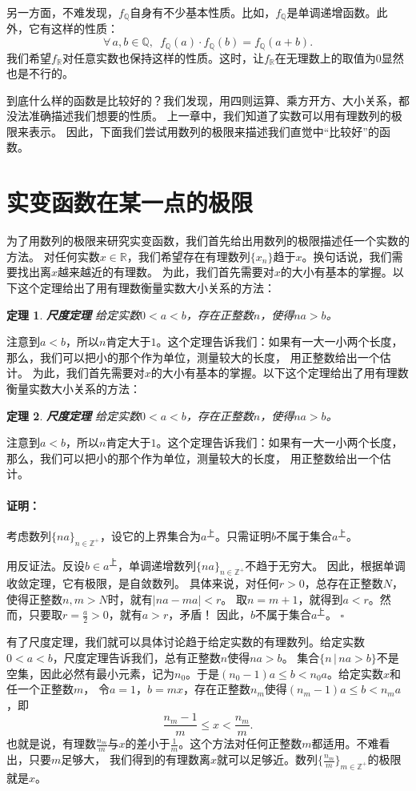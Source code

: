 \documentclass[12pt,UTF8]{ctexbook}
\newtheorem{tm}{定理}[section]
\newenvironment{proof2}{\paragraph{\textbf{证明：}}}{\hfill$\square$}
\begin{document}
另一方面，不难发现，$f_{\mathbb{Q}}$自身有不少基本性质。比如，$f_{\mathbb{Q}}$是单调递增函数。此外，它有这样的性质：
$$\forall \, a, b\in \mathbb{Q}, \,\,\, f_{\mathbb{Q}}(a) \cdot f_{\mathbb{Q}}(b) = f_{\mathbb{Q}}(a + b).$$
我们希望$f_{\mathbb{R}}$对任意实数也保持这样的性质。这时，让$f_{\mathbb{R}}$在无理数上的取值为$0$显然也是不行的。

到底什么样的函数是比较好的？我们发现，用四则运算、乘方开方、大小关系，都没法准确描述我们想要的性质。
上一章中，我们知道了实数可以用有理数列的极限来表示。
因此，下面我们尝试用数列的极限来描述我们直觉中“比较好”的函数。

\section{实变函数在某一点的极限}
为了用数列的极限来研究实变函数，我们首先给出用数列的极限描述任一个实数的方法。
对任何实数$x\in\mathbb{R}$，我们希望存在有理数列$\{x_n\}$趋于$x$。换句话说，我们需要找出离$x$越来越近的有理数。
为此，我们首先需要对$x$的大小有基本的掌握。以下这个定理给出了用有理数衡量实数大小关系的方法：
\begin{tm}\textbf{尺度定理}
    给定实数$0<a<b$，存在正整数$n$，使得$na > b$。    
\end{tm}
注意到$a<b$，所以$n$肯定大于$1$。这个定理告诉我们：如果有一大一小两个长度，那么，我们可以把小的那个作为单位，测量较大的长度，
用正整数给出一个估计。
为此，我们首先需要对$x$的大小有基本的掌握。以下这个定理给出了用有理数衡量实数大小关系的方法：
\begin{tm}\textbf{尺度定理}
    给定实数$0<a<b$，存在正整数$n$，使得$na > b$。    
\end{tm}
注意到$a<b$，所以$n$肯定大于$1$。这个定理告诉我们：如果有一大一小两个长度，那么，我们可以把小的那个作为单位，测量较大的长度，
用正整数给出一个估计。
\begin{proof2}
    考虑数列$\{na\}_{n\in\mathbb{Z}^+}$，设它的上界集合为$a^{\text{上}}$。只需证明$b$不属于集合$a^{\text{上}}$。

    用反证法。反设$b\in a^{\text{上}}$，单调递增数列$\{na\}_{n\in\mathbb{Z}^+}$不趋于无穷大。
    因此，根据单调收敛定理，它有极限，是自敛数列。
    具体来说，对任何$r > 0$，总存在正整数$N$，使得正整数$n,m>N$时，就有$|na - ma| < r$。
    取$n=m+1$，就得到$a < r$。然而，只要取$r = \frac{a}{2} > 0$，就有$a > r$，矛盾！
    因此，$b$不属于集合$a^{\text{上}}$。
\end{proof2}


有了尺度定理，我们就可以具体讨论趋于给定实数的有理数列。给定实数$0<a<b$，尺度定理告诉我们，总有正整数$n$使得$na > b$。
集合$\{n \, | \, na > b\}$不是空集，因此必然有最小元素，记为$n_0$。于是$(n_0 - 1)a \leqslant b < n_0a$。给定实数$x$和任一个正整数$m$，
令$a=1$，$b=mx$，存在正整数$n_m$使得$(n_m - 1)a \leqslant b < n_ma$，即
$$ \frac{n_m - 1}{m} \leqslant x < \frac{n_m}{m}. $$
也就是说，有理数$\frac{n_m}{m}$与$x$的差小于$\frac{1}{m}$。这个方法对任何正整数$m$都适用。不难看出，只要$m$足够大，
我们得到的有理数离$x$就可以足够近。数列$\{\frac{n_m}{m}\}_{m\in\mathbb{Z}^+}$的极限就是$x$。
\end{document}
